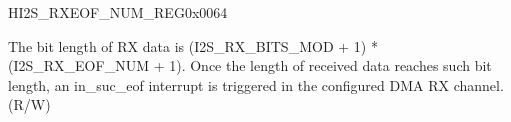 \begin{register}{H}{I2S\_RXEOF\_NUM\_REG}{0x{}0064}\label{regdesc:I2SRXEOFNUMREG}
%
%
\regnewline%
\begin{regdesc}\begin{reglist}
\label{fielddesc:I2SRXEOFNUM}\item [I2S\_RX\_EOF\_NUM] The bit length of RX data is (I2S\_RX\_BITS\_MOD + 1) * (I2S\_RX\_EOF\_NUM + 1). Once the length of received data reaches such bit length, an in\_suc\_eof interrupt is triggered in the configured DMA RX channel. (R/W)
\end{reglist}\end{regdesc}
\end{register}


